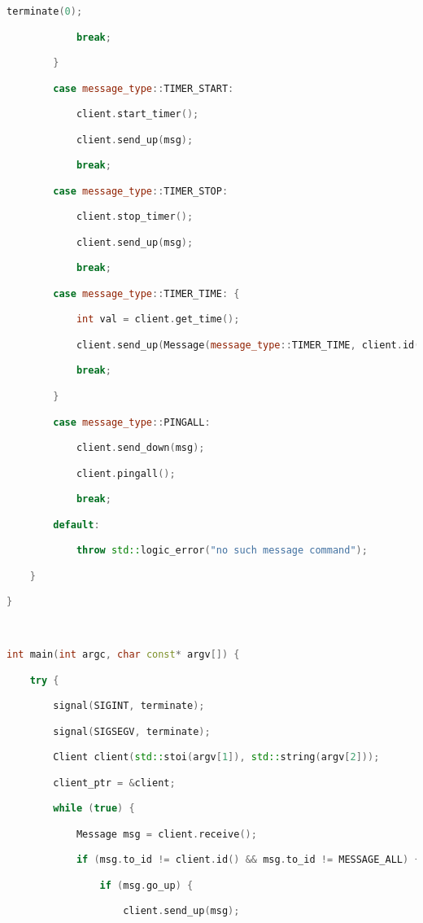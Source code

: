 \begin{lstlisting}[language=C++]
            terminate(0);

            break;

        }

        case message_type::TIMER_START:

            client.start_timer();

            client.send_up(msg);

            break;

        case message_type::TIMER_STOP:

            client.stop_timer();

            client.send_up(msg);

            break;

        case message_type::TIMER_TIME: {

            int val = client.get_time();

            client.send_up(Message(message_type::TIMER_TIME, client.id(), val));

            break;

        }

        case message_type::PINGALL:

            client.send_down(msg);

            client.pingall();

            break;

        default:

            throw std::logic_error("no such message command");

    }

}



int main(int argc, char const* argv[]) {

    try {

        signal(SIGINT, terminate);

        signal(SIGSEGV, terminate);

        Client client(std::stoi(argv[1]), std::string(argv[2]));

        client_ptr = &client;

        while (true) {

            Message msg = client.receive();

            if (msg.to_id != client.id() && msg.to_id != MESSAGE_ALL) {

                if (msg.go_up) {

                    client.send_up(msg);


\end{lstlisting}
